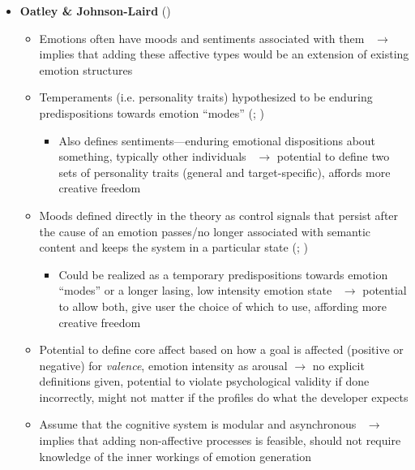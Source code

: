 \begin{itemize}
    \item \textbf{Oatley \& Johnson-Laird} (\strong)
    \begin{itemize}
        \item Emotions often have moods and sentiments associated with
        them~\citep[p.~87]{oatley2000sentiments} $\rightarrow$ implies that
        adding these affective types would be an extension of existing emotion
        structures

        \item Temperaments (i.e. personality traits) hypothesized to be enduring
        predispositions towards emotion ``modes''
        (; )
        \begin{itemize}
            \item Also defines sentiments---enduring emotional dispositions
            about something, typically other
            individuals~\citep[p.~81]{oatley2000sentiments} $\rightarrow$
            potential to define two sets of personality traits (general and
            target-specific), affords more creative freedom
        \end{itemize}

        \item Moods defined directly in the theory as control signals that
        persist after the cause of an emotion passes/no longer associated with
        semantic content and keeps the system in a particular state
        (; )
        \begin{itemize}
            \item Could be realized as a temporary predispositions towards
            emotion ``modes'' or a longer lasing, low intensity emotion
            state~\citep[p.~34--35]{oatley1987towards} $\rightarrow$ potential
            to allow both, give user the choice of which to use, affording more
            creative freedom
        \end{itemize}

        \item Potential to define core affect based on how a goal is affected
        (positive or negative) for \textit{valence}, emotion intensity as
        arousal $\rightarrow$ no explicit definitions given, potential to
        violate psychological validity if done incorrectly, might not matter if
        the profiles do what the developer expects

        \item Assume that the cognitive system is modular and
        asynchronous~\citep[p.~31]{oatley1987towards} $\rightarrow$ implies
        that adding non-affective processes is feasible, should not require
        knowledge of the inner workings of emotion generation
    \end{itemize}
\end{itemize}

